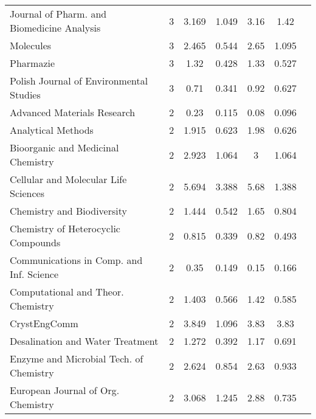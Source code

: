 {\begin{longtable}[c]{lcccccc}
 Journal of Pharm. and Biomedicine Analysis                & 3  & 3.169         & 1.049          & 3.16 & 1.42          \\
 Molecules                                                 & 3  & 2.465         & 0.544          & 2.65 & 1.095         \\
 Pharmazie                                                 & 3  & 1.32          & 0.428          & 1.33 & 0.527         \\[1ex]
 Polish Journal of Environmental Studies                   & 3  & 0.71          & 0.341          & 0.92 & 0.627         \\
 Advanced Materials Research                               & 2  & 0.23          & 0.115          & 0.08 & 0.096         \\
 Analytical Methods                                        & 2  & 1.915         & 0.623          & 1.98 & 0.626         \\
 Bioorganic and Medicinal Chemistry                        & 2  & 2.923         & 1.064          & 3    & 1.064         \\
 Cellular and Molecular Life Sciences                      & 2  & 5.694         & 3.388          & 5.68 & 1.388         \\[1ex]
 Chemistry and Biodiversity                                & 2  & 1.444         & 0.542          & 1.65 & 0.804         \\
 Chemistry of Heterocyclic Compounds                       & 2  & 0.815         & 0.339          & 0.82 & 0.493         \\
 Communications in Comp. and Inf. Science                  & 2  & 0.35          & 0.149          & 0.15 & 0.166         \\
 Computational and Theor. Chemistry                        & 2  & 1.403         & 0.566          & 1.42 & 0.585         \\
 CrystEngComm                                              & 2  & 3.849         & 1.096          & 3.83 & 3.83          \\[1ex]
 Desalination and Water Treatment                          & 2  & 1.272         & 0.392          & 1.17 & 0.691         \\
 Enzyme and Microbial Tech. of Chemistry                   & 2  & 2.624         & 0.854          & 2.63 & 0.933         \\
 European Journal of Org. Chemistry                        & 2  & 3.068         & 1.245          & 2.88 & 0.735         \\

\end{longtable}}
